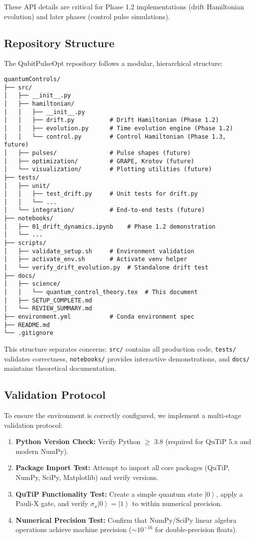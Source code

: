 \documentclass[11pt,a4paper]{article}
\theoremstyle{definition}
\theoremstyle{remark}
\newcommand{\ket}[1]{\left|#1\right\rangle}
\newcommand{\paulix}{\sigma_x}
\begin{document}
These API details are critical for Phase 1.2 implementations (drift Hamiltonian evolution) and later phases (control pulse simulations).

\subsection{Repository Structure}

The QubitPulseOpt repository follows a modular, hierarchical structure:

\begin{verbatim}
quantumControls/
├── src/
│   ├── __init__.py
│   ├── hamiltonian/
│   │   ├── __init__.py
│   │   ├── drift.py          # Drift Hamiltonian (Phase 1.2)
│   │   ├── evolution.py      # Time evolution engine (Phase 1.2)
│   │   └── control.py        # Control Hamiltonian (Phase 1.3, future)
│   ├── pulses/               # Pulse shapes (future)
│   ├── optimization/         # GRAPE, Krotov (future)
│   └── visualization/        # Plotting utilities (future)
├── tests/
│   ├── unit/
│   │   ├── test_drift.py     # Unit tests for drift.py
│   │   └── ...
│   └── integration/          # End-to-end tests (future)
├── notebooks/
│   ├── 01_drift_dynamics.ipynb    # Phase 1.2 demonstration
│   └── ...
├── scripts/
│   ├── validate_setup.sh     # Environment validation
│   ├── activate_env.sh       # Activate venv helper
│   └── verify_drift_evolution.py  # Standalone drift test
├── docs/
│   ├── science/
│   │   └── quantum_control_theory.tex  # This document
│   ├── SETUP_COMPLETE.md
│   └── REVIEW_SUMMARY.md
├── environment.yml           # Conda environment spec
├── README.md
└── .gitignore
\end{verbatim}

This structure separates concerns: \texttt{src/} contains all production code, \texttt{tests/} validates correctness, \texttt{notebooks/} provides interactive demonstrations, and \texttt{docs/} maintains theoretical documentation.

\subsection{Validation Protocol}

To ensure the environment is correctly configured, we implement a multi-stage validation protocol:

\begin{enumerate}[label=\textbf{Stage \arabic*:}]
    \item \textbf{Python Version Check:} Verify Python $\geq$ 3.8 (required for QuTiP 5.x and modern NumPy).
    \item \textbf{Package Import Test:} Attempt to import all core packages (QuTiP, NumPy, SciPy, Matplotlib) and verify versions.
    \item \textbf{QuTiP Functionality Test:} Create a simple quantum state $\ket{0}$, apply a Pauli-X gate, and verify $\paulix \ket{0} = \ket{1}$ to within numerical precision.
    \item \textbf{Numerical Precision Test:} Confirm that NumPy/SciPy linear algebra operations achieve machine precision ($\sim 10^{-16}$ for double-precision floats).
\end{enumerate}
\end{document}
